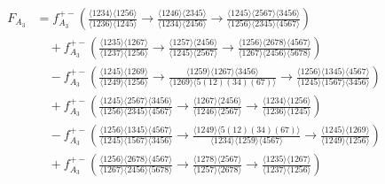 \documentclass[11pt]{article}
\begin{document}
\begin{align} 
F_{A_3}  &= f_{A_3}^{+-} \left( \tfrac{\langle 1234 \rangle \langle 1256 \rangle}{\langle 1236 \rangle \langle 1245 \rangle} \! 
    \to \! \tfrac{\langle 1246\rangle \langle 2345 \rangle}{\langle 1234 \rangle \langle 2456 \rangle} \! 
    \to \! \tfrac{\langle 1245\rangle \langle 2567 \rangle \langle 3456 \rangle }{\langle 1256 \rangle \langle 2345 \rangle \langle 4567 \rangle} \right) \nonumber \\
&\quad+ f_{A_3}^{+-} \left( \tfrac{\langle 1235 \rangle \langle 1267 \rangle}{\langle 1237 \rangle  \langle 1256 \rangle} \! 
    \to \! \tfrac{\langle 1257 \rangle \langle 2456 \rangle}{\langle 1245 \rangle \langle 2567 \rangle} \! 
    \to \! \tfrac{\langle 1256 \rangle \langle 2678 \rangle \langle 4567 \rangle}{\langle 1267 \rangle \langle 2456 \rangle \langle 5678 \rangle} \right) \nonumber \\
&\quad- f_{A_3}^{+-} \left( \tfrac{\langle 1245 \rangle \langle 1269 \rangle}{\langle 1249 \rangle \langle 1256 \rangle} \! 
    \to \! \tfrac{\langle 1259 \rangle \langle 1267 \rangle \langle 3456 \rangle}{\langle 1269 \rangle \langle 5(12)(34)(67) \rangle} \! 
    \to \! \tfrac{\langle 1256 \rangle \langle 1345 \rangle \langle 4567 \rangle}{\langle 1245 \rangle \langle 1567 \rangle \langle 3456 \rangle} \right) \nonumber \\
&\quad+ f_{A_3}^{+-} \left( \tfrac{\langle 1245 \rangle \langle 2567 \rangle \langle 3456 \rangle}{\langle 1256 \rangle \langle 2345 \rangle \langle 4567 \rangle} \! 
    \to \! \tfrac{\langle 1267 \rangle  \langle 2456 \rangle}{\langle 1246 \rangle \langle 2567 \rangle} \! 
    \to \! \tfrac{\langle 1234 \rangle  \langle 1256 \rangle}{\langle 1236 \rangle \langle 1245 \rangle} \right) \nonumber \\
&\quad- f_{A_3}^{+-} \left(\tfrac{\langle 1256 \rangle \langle 1345 \rangle \langle 4567 \rangle}{\langle 1245 \rangle \langle 1567 \rangle \langle 3456 \rangle} \! 
    \to \! \tfrac{\langle 1249 \rangle \langle 5(12)(34)(67)\rangle}{\langle 1234 \rangle \langle 1259 \rangle \langle 4567 \rangle} \! 
    \to \! \tfrac{\langle 1245 \rangle \langle 1269 \rangle}{\langle 1249 \rangle \langle 1256 \rangle} \right) \\ 
&\quad+ f_{A_3}^{+-} \left( \tfrac{\langle 1256 \rangle \langle 2678 \rangle \langle 4567 \rangle}{\langle 1267 \rangle \langle 2456 \rangle \langle 5678 \rangle} \! 
    \to \! \tfrac{\langle 1278 \rangle \langle 2567 \rangle}{\langle 1257 \rangle \langle 2678 \rangle} \! 
    \to \! \tfrac{\langle 1235 \rangle \langle 1267 \rangle}{\langle 1237 \rangle \langle 1256 \rangle} \right) \nonumber \\

\end{align}
\end{document}
